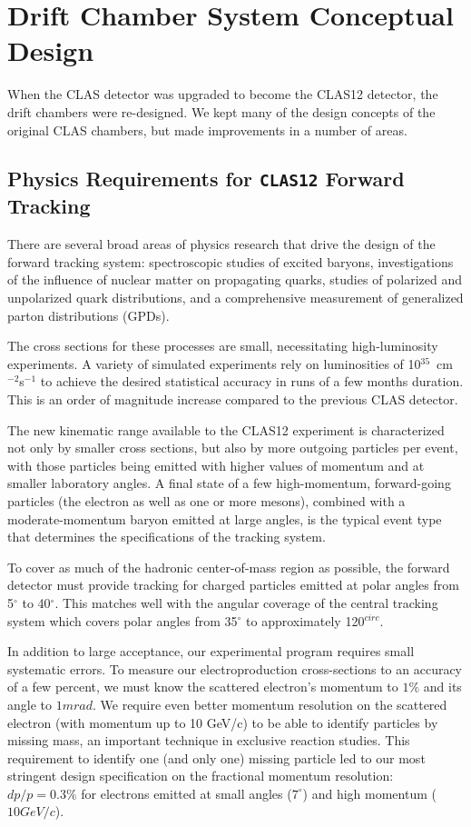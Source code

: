 \section{Drift Chamber System Conceptual Design}

When the CLAS detector was upgraded to become the CLAS12 detector, the
drift chambers were re-designed.  We kept many of the design concepts
of the original CLAS chambers, but made improvements in a number
of areas.

\subsection{Physics Requirements for {\tt CLAS12} Forward Tracking}

There are several broad areas of physics research that drive 
the design of the forward tracking system: 
spectroscopic studies of excited baryons, investigations of 
the influence of nuclear matter on propagating quarks, studies of polarized 
and unpolarized quark distributions, and a comprehensive measurement of 
generalized parton distributions (GPDs). 

The cross sections for these processes are small, necessitating high-luminosity 
experiments.  A variety of simulated experiments rely on luminosities of 
10$^{35}$~cm$^{-2}$s$^{-1}$ to achieve the desired statistical accuracy in 
runs of a few months duration.  This is an order of magnitude increase
compared to the previous CLAS detector.  

The new kinematic range available to the CLAS12 experiment is
characterized not only by smaller cross sections, but also by more outgoing 
particles per event, with those particles being emitted with higher values 
of momentum and at smaller laboratory angles.  
A final state of a few high-momentum, forward-going particles (the electron as well as one 
or more mesons), combined with a moderate-momentum baryon emitted at large 
angles, is the typical event type that determines the specifications of the 
tracking system. 

To cover as much of the hadronic center-of-mass region as possible, the forward 
detector must provide tracking for charged particles emitted at polar angles 
from 5$^\circ$ to 40$^\circ$.  This matches well with the angular coverage of
the central tracking system which covers polar angles from  35$^\circ$ to approximately 120$^{circ}$.

In addition to large acceptance, our experimental program requires
small systematic errors.  To measure our electroproduction cross-sections
to an accuracy of a few percent, we must know the scattered electron's
momentum to $1\%$ and its angle to $1 mrad$.  
We require even better momentum resolution on the scattered
electron (with momentum up to 10 GeV/c) to be able to identify particles
by missing mass, an important technique in exclusive reaction studies.
This requirement to identify one (and only one) missing particle led to our 
most stringent design specification on the fractional momentum resolution:
$dp/p = 0.3\%$ for electrons emitted at small angles ($7^{\circ}$) and high
momentum ($10 GeV/c$).  

